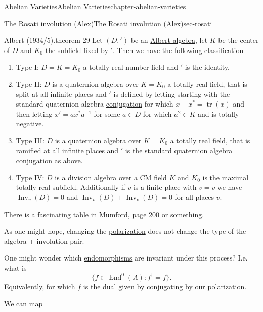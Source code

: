 \documentclass[oneside,10pt,]{book}
\numberwithin{equation}{section}
\DeclareMathOperator{\End}{End}
\DeclareMathOperator{\tr}{tr}
\begin{document}
\begin{chapterptx}{Abelian Varieties}{}{Abelian Varieties}{}{}{chapter-abelian-varieties}
\begin{sectionptx}{The Rosati involution (Alex)}{}{The Rosati involution (Alex)}{}{}{sec-rosati}
\begin{theorem}{Albert (1934/5).}{}{theorem-29}%
\hypertarget{p-346}{}%
Let \((D, ')\) be an \hyperref[def-albert-alg]{Albert algebra}, let \(K\) be the center of \(D\) and \(K_0\) the subfield fixed by \('\). Then we have the following classification\leavevmode%
\begin{enumerate}
\item\hypertarget{li-56}{}Type I: \(D = K = K_0\) a totally real number field and \('\) is the identity.%
\item\hypertarget{li-57}{}Type II: \(D\) is a quaternion algebra over \(K = K_0\) a totally real field, that is split at all infinite places and \('\) is defined by letting starting with the standard quaternion algebra \hyperref[def-quat-alg-conj-trace-norm]{conjugation} for which \(x + x^* = \tr(x)\) and then letting \(x' = ax^* a^{-1}\) for some \(a \in D\) for which \(a^2 \in K\) and is totally negative.%
\item\hypertarget{li-58}{}Type III: \(D\) is a quaternion algebra over \(K = K_0\) a totally real field, that is \hyperref[def-dess-ramified]{ramified} at all infinite places and \('\) is the standard quaternion algebra \hyperref[def-quat-alg-conj-trace-norm]{conjugation} as above.%
\item\hypertarget{li-59}{}Type IV: \(D\) is a division algebra over a CM field \(K\) and \(K_0\) is the maximal totally real subfield. Additionally if \(v\) is a finite place with \(v = \bar v\) we have \(\operatorname{Inv}_v(D) = 0\) and \(\operatorname{Inv}_v(D) + \operatorname{Inv}_{\bar v}(D) = 0\) for all places \(v\).%
\end{enumerate}
%
\end{theorem}
\hypertarget{p-347}{}%
There is a fascinating table in Mumford, page 200 or something.%
\par
\hypertarget{p-348}{}%
As one might hope, changing the \hyperref[def-c-pol]{polarization} does not change the type of the algebra + involution pair.%
\par
\hypertarget{p-349}{}%
One might wonder which \hyperref[def-supersing-isog-endo]{endomorphisms} are invariant under this process? I.e. what is%
\begin{equation*}
\{f \in \End^0(A) : f^\dagger = f\}\text{.}
\end{equation*}
Equivalently, for which \(f\) is the dual given by conjugating by our \hyperref[def-c-pol]{polarization}.%
\par
\hypertarget{p-350}{}%
We can map%
\begin{equation*}

\end{equation*}
\end{sectionptx}
\end{chapterptx}
\end{document}

